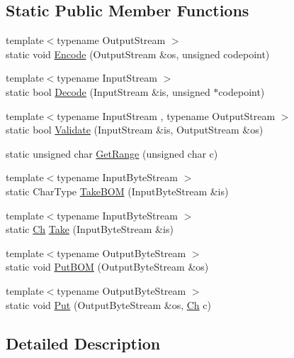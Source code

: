 \subsection*{Static Public Member Functions}
\begin{DoxyCompactItemize}
\item 
{\footnotesize template$<$typename Output\+Stream $>$ }\\static void \hyperlink{structUTF8_af286ed19ca60d261a9b11b65bee1298b}{Encode} (Output\+Stream \&os, unsigned codepoint)
\item 
{\footnotesize template$<$typename Input\+Stream $>$ }\\static bool \hyperlink{structUTF8_a17c6badb31acf4f784111c886737fb17}{Decode} (Input\+Stream \&is, unsigned $\ast$codepoint)
\item 
{\footnotesize template$<$typename Input\+Stream , typename Output\+Stream $>$ }\\static bool \hyperlink{structUTF8_a9e2e7e37d819baeb5e643654c6e61e33}{Validate} (Input\+Stream \&is, Output\+Stream \&os)
\item 
static unsigned char \hyperlink{structUTF8_ac06bbf38df41adb0c7b9eaa93f85cc38}{Get\+Range} (unsigned char c)
\item 
{\footnotesize template$<$typename Input\+Byte\+Stream $>$ }\\static Char\+Type \hyperlink{structUTF8_a1b2359d6ea50ae32fefc9b28e9878a31}{Take\+B\+OM} (Input\+Byte\+Stream \&is)
\item 
{\footnotesize template$<$typename Input\+Byte\+Stream $>$ }\\static \hyperlink{structUTF8_a8e78c8113f3660178d8121b7d3e55890}{Ch} \hyperlink{structUTF8_a5b2561a5031c8a699e593cd51b2c6864}{Take} (Input\+Byte\+Stream \&is)
\item 
{\footnotesize template$<$typename Output\+Byte\+Stream $>$ }\\static void \hyperlink{structUTF8_a6b171e5f0662ad81d498875bbdbc536a}{Put\+B\+OM} (Output\+Byte\+Stream \&os)
\item 
{\footnotesize template$<$typename Output\+Byte\+Stream $>$ }\\static void \hyperlink{structUTF8_ab24c23227413798e9be28a21eb26fe51}{Put} (Output\+Byte\+Stream \&os, \hyperlink{structUTF8_a8e78c8113f3660178d8121b7d3e55890}{Ch} c)
\end{DoxyCompactItemize}


\subsection{Detailed Description}
